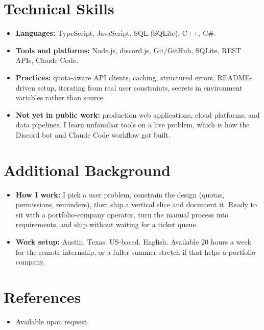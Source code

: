 \documentclass[11pt,a4paper,sans]{moderncv}
\begin{document}
\section{Technical Skills}
\vspace{1pt}
\begin{itemize}
\item \textbf{Languages:} TypeScript, JavaScript, SQL (SQLite), C++, C\#.
\item \textbf{Tools and platforms:} Node.js, discord.js, Git/GitHub, SQLite, REST APIs, Claude Code.
\item \textbf{Practices:} quota-aware API clients, caching, structured errors, README-driven setup, iterating from real user constraints, secrets in environment variables rather than source.
\item \textbf{Not yet in public work:} production web applications, cloud platforms, and data pipelines. I learn unfamiliar tools on a live problem, which is how the Discord bot and Claude Code workflow got built.
\end{itemize}


\section{Additional Background}
\vspace{1pt}
\begin{itemize}
\item \textbf{How I work:} I pick a user problem, constrain the design (quotas, permissions, reminders), then ship a vertical slice and document it. Ready to sit with a portfolio-company operator, turn the manual process into requirements, and ship without waiting for a ticket queue.
\item \textbf{Work setup:} Austin, Texas. US-based. English. Available 20 hours a week for the remote internship, or a fuller summer stretch if that helps a portfolio company.
\end{itemize}


\section{References}
\vspace{1pt}
\begin{itemize}
\item{Available upon request.}
\end{itemize}
\end{document}
